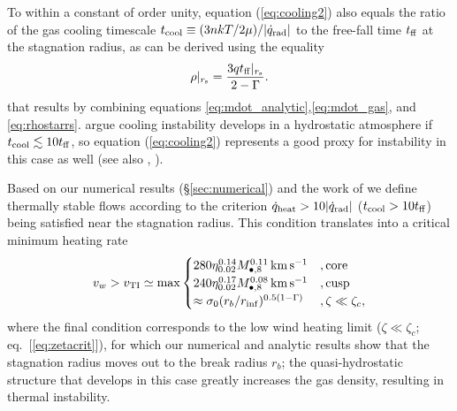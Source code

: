 \documentclass[usenatbib,fleqn]{mn2e}
\newcommand{\tff}{t_{\rm ff}}
\begin{document}
To within a constant of order unity, equation (\ref{eq:cooling2}) also
equals the ratio of the gas cooling timescale $t_{\rm cool} \equiv (3n
kT/2 \mu)/|\dot{q}_{\rm rad}|$ to the free-fall time $t_{\rm ff}$ at the
stagnation radius, as can be derived using the equality
\begin{align}
\rho|_{r_{\rm s}}=\frac{3 q\tff|_{r_{\rm s}}}{2-\Gamma}.
\label{eq:rhors2}
\end{align}
that results by combining equations
\eqref{eq:mdot_analytic},\eqref{eq:mdot_gas}, and
\eqref{eq:rhostarrs}.  \citet{McCourt+12} argue cooling instability
develops in a hydrostatic atmosphere if $t_{\rm cool} \lesssim 10 t_{\rm ff}$,
so equation (\ref{eq:cooling2}) represents a good proxy for
instability in this case as well (see also \citealt{Li&Bryan14a}, \citealt{Li&Bryan14b}).

Based on our numerical results (\S \ref{sec:numerical}) and the work of \citet{McCourt+12} we define thermally stable flows according to the criterion $\dot{q}_{\rm heat} > 10|\dot{q}_{\rm rad}|$ ($t_{\rm
  cool} > 10t_{\rm ff}$) being satisfied near the stagnation radius.  This condition translates into a
critical minimum heating rate
\begin{align}
v_{w} > v_{\rm TI} \simeq
  {\rm max}\begin{cases}
   280 \eta_{0.02}^{0.14} M_{\bullet,8}^{0.11}\,{\rm km\,s^{-1}}  &, \text{core}\\
   240 \eta_{0.02}^{0.17} M_{\bullet,8}^{0.08}\,{\rm km\,s^{-1}}   &, \text{cusp}  \\
\approx \sigma_0(r_{b}/r_{\rm inf})^{0.5(1-\Gamma)} &, \zeta \ll \zeta_c, 
  \end{cases}
  \label{eq:cooling3}
\end{align}
where the final condition corresponds to the low wind heating limit
($\zeta \ll \zeta_c$; eq.~[\ref{eq:zetacrit}]), for which our
numerical and analytic results show that the stagnation radius moves
out to the break radius $r_b$; the quasi-hydrostatic structure that
develops in this case greatly increases the gas density, resulting in
thermal instability.
\end{document}

